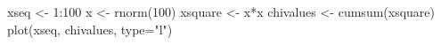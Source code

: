\begin{Schunk}
\begin{Sinput}
 xseq <- 1:100
 x <- rnorm(100)
 xsquare <- x*x
 chivalues <- cumsum(xsquare)
 plot(xseq, chivalues, type="l")
\end{Sinput}
\end{Schunk}
